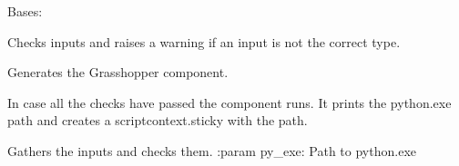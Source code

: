 \documentclass[letterpaper,10pt,english]{sphinxmanual}
\begin{document}

\begin{fulllineitems}
\label{\detokenize{miscellaneous:livestock.components.misc.PythonExecutor}}
Bases: {\hyperref[\detokenize{superclass:livestock.components.component.GHComponent}]{}}

\begin{fulllineitems}
\label{\detokenize{miscellaneous:livestock.components.misc.PythonExecutor.check_inputs}}
Checks inputs and raises a warning if an input is not the correct type.

\end{fulllineitems}


\begin{fulllineitems}
\label{\detokenize{miscellaneous:livestock.components.misc.PythonExecutor.config}}
Generates the Grasshopper component.

\end{fulllineitems}


\begin{fulllineitems}
\label{\detokenize{miscellaneous:livestock.components.misc.PythonExecutor.run}}
In case all the checks have passed the component runs.
It prints the python.exe path and creates a scriptcontext.sticky with the path.

\end{fulllineitems}


\begin{fulllineitems}
\label{\detokenize{miscellaneous:livestock.components.misc.PythonExecutor.run_checks}}
Gathers the inputs and checks them.
:param py\_exe: Path to python.exe

\end{fulllineitems}


\end{fulllineitems}
\end{document}
